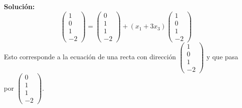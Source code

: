 \documentclass[12pt]{article}
\newenvironment{solucion}
{\begin{mdframed}[backgroundcolor=black!10]
		{\bf Solución:}\\
	}
	{
	\end{mdframed}
}
\newenvironment{preguntas}
{\begin{enumerate}\itemsep12pt
	}
	{
	\end{enumerate}
}
\begin{document}
\begin{preguntas}
\begin{solucion}
$$\begin{pmatrix}
1\\
0\\
1\\
-2
\end{pmatrix} = 
\begin{pmatrix}
0\\
1\\
1\\
-2
\end{pmatrix} +
(x_1 + 3x_3) \begin{pmatrix}
1\\
0\\
1\\
-2
\end{pmatrix}
$$
{\small Esto corresponde a la ecuación de una recta con dirección $\begin{pmatrix}
1\\
0\\
1\\
-2
\end{pmatrix}$ y que pasa por $\begin{pmatrix}
0\\
1\\
1\\
-2
\end{pmatrix}$.}
\end{solucion}
\end{preguntas}
\end{document}
